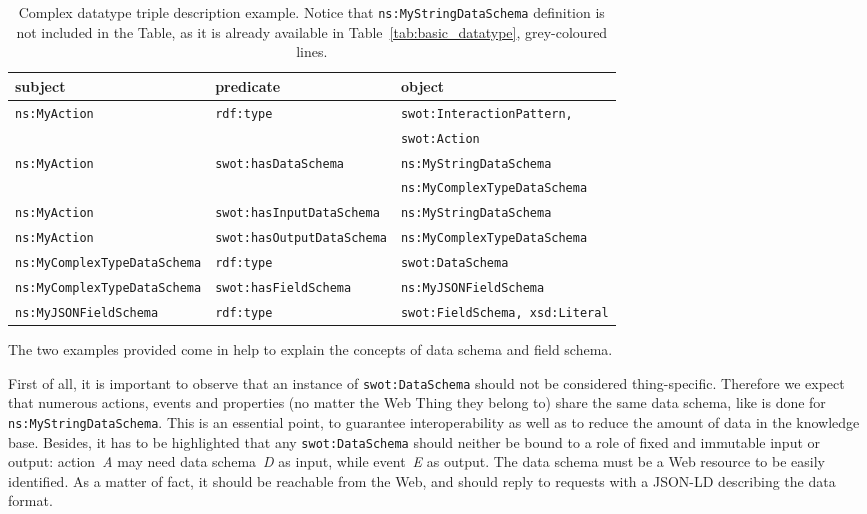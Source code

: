 \begin{table*}[t]
\centering
\footnotesize
\caption{Complex datatype triple description example. Notice that \texttt{ns:MyStringDataSchema} definition is not included in the Table, as it is already available in Table~\ref{tab:basic_datatype}, grey-coloured lines.}
\label{tab:complex_datatype}
\begin{tabular}{lll}
\textbf{subject}           & \textbf{predicate}           & \textbf{object}           \\ \hline
\texttt{ns:MyAction}       & \texttt{rdf:type}            & \texttt{swot:InteractionPattern,}  \\
   &  & \texttt{swot:Action}  \\ \hline
\texttt{ns:MyAction}       & \texttt{swot:hasDataSchema}   & \texttt{ns:MyStringDataSchema} \\
      &    & \texttt{ns:MyComplexTypeDataSchema} \\ \hline
\texttt{ns:MyAction}       & \texttt{swot:hasInputDataSchema} & \texttt{ns:MyStringDataSchema}  \\ \hline
\texttt{ns:MyAction}       & \texttt{swot:hasOutputDataSchema} & \texttt{ns:MyComplexTypeDataSchema}  \\ \hline
\texttt{ns:MyComplexTypeDataSchema}& \texttt{rdf:type}            & \texttt{swot:DataSchema}   \\ \hline
\texttt{ns:MyComplexTypeDataSchema}& \texttt{swot:hasFieldSchema}  & \texttt{ns:MyJSONFieldSchema} \\ \hline
\texttt{ns:MyJSONFieldSchema} & \texttt{rdf:type}        & \texttt{swot:FieldSchema, xsd:Literal}\\ \hline
\end{tabular}
\end{table*}

The two examples provided come in help to explain the concepts of data schema and field schema. 

First of all, it is important to observe that an instance of \texttt{swot:DataSchema} should not be considered thing-specific. Therefore we expect that numerous actions, events and properties (no matter the Web Thing they belong to) share the same data schema, like is done for \texttt{ns:MyStringDataSchema}. This is an essential point, to guarantee interoperability as well as to reduce the amount of data in the knowledge base. Besides, it has to be highlighted that any \texttt{swot:DataSchema} should neither be bound to a role of fixed and immutable input or output: action~\textit{A} may need data schema~\textit{D} as input, while event~\textit{E} as output. The data schema must be a Web resource to be easily identified. As a matter of fact, it should be reachable from the Web, and should reply to requests with a JSON-LD describing the data format.

